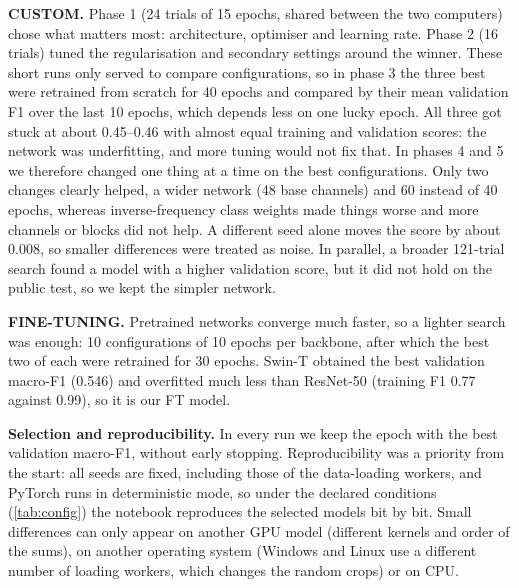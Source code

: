 \textbf{CUSTOM.} Phase 1 (24 trials of 15 epochs, shared between the two computers) chose what matters most: architecture, optimiser and learning rate. Phase 2 (16 trials) tuned the regularisation and secondary settings around the winner. These short runs only served to compare configurations, so in phase 3 the three best were retrained from scratch for 40 epochs and compared by their mean validation F1 over the last 10 epochs, which depends less on one lucky epoch. All three got stuck at about 0.45--0.46 with almost equal training and validation scores: the network was underfitting, and more tuning would not fix that. In phases 4 and 5 we therefore changed one thing at a time on the best configurations. Only two changes clearly helped, a wider network (48 base channels) and 60 instead of 40 epochs, whereas inverse-frequency class weights made things worse and more channels or blocks did not help. A different seed alone moves the score by about 0.008, so smaller differences were treated as noise. In parallel, a broader 121-trial search found a model with a higher validation score, but it did not hold on the public test, so we kept the simpler network.

\textbf{FINE-TUNING.} Pretrained networks converge much faster, so a lighter search was enough: 10 configurations of 10 epochs per backbone, after which the best two of each were retrained for 30 epochs. Swin-T obtained the best validation macro-F1 (0.546) and overfitted much less than ResNet-50 (training F1 0.77 against 0.99), so it is our FT model.

\textbf{Selection and reproducibility.} In every run we keep the epoch with the best validation macro-F1, without early stopping. Reproducibility was a priority from the start: all seeds are fixed, including those of the data-loading workers, and PyTorch runs in deterministic mode, so under the declared conditions (\cref{tab:config}) the notebook reproduces the selected models bit by bit. Small differences can only appear on another GPU model (different kernels and order of the sums), on another operating system (Windows and Linux use a different number of loading workers, which changes the random crops) or on CPU.
